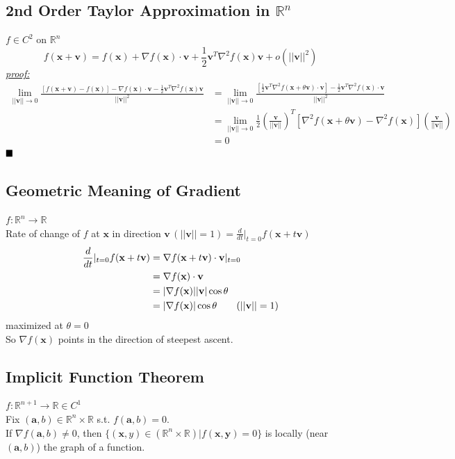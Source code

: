 \documentclass[11pt]{article}
\newcommand{\tb}[1]{\textbf{#1}}
\newcommand{\real}[0]{\mathbb{R}}
\newcommand{\proof}[0]{\textit{\underline{proof:} }}
\newcommand{\vx}[0]{\tb{x}}
\newcommand{\vy}[0]{\tb{y}}
\newcommand{\va}[0]{\tb{a}}
\newcommand{\vv}[0]{\tb{v}}
\newcommand{\qed}[0]{$\hfill\blacksquare$}
\begin{document}
\subsection{2nd Order Taylor Approximation in $\real^n$}
$f \in C^2$ on $\real^n$ \\
$$f(\vx + \vv) = f(\vx) + \nabla f(\vx) \cdot \vv + \frac{1}{2}\vv^T\nabla^2 f(\vx) \vv + o(||\vv||^2)$$
\proof \\
\begin{align*}
	\underset{||\vv|| \rightarrow 0}{\lim} \frac{[f(\vx + \vv) - f(\vx)] - \nabla f(\vx)\cdot \vv - \frac{1}{2} \vv^T \nabla^2 f(\vx)\vv}{||\vv||^2} 
	&= \underset{||\vv|| \rightarrow 0}{\lim} \frac{[\frac{1}{2}\vv^T\nabla^2 f(\vx + \theta \vv) \cdot \vv] - \frac{1}{2}\vv^T\nabla^2 f(\vx) \cdot \vv}{||\vv||^2} \tag{By 2nd MVT}\\
	&=  \underset{||\vv|| \rightarrow 0}{\lim} \frac{1}{2}(\frac{\vv}{||\vv||})^T[\nabla^2 f(\vx + \theta \vv) - \nabla^2 f(\vx)](\frac{\vv}{||\vv||}) \\
	&= 0
\end{align*}
\qed 
\subsection{Geometric Meaning of Gradient}
$f: \real^n \rightarrow \real$\\
Rate of change of $f$ at $\vx$ in direction $\vv \, (||\vv||=1) = \frac{d}{dt}|_{t=0}f(\vx + t\vv)$
\begin{align*}
	\frac{d}{dt}|_{t=0}f(\vx + t\vv) &= \nabla f(\vx + t\vv) \cdot \vv |_{t=0} \\
	&= \nabla f(\vx)\cdot \vv \\
	&= |\nabla f(\vx)| |\vv| \cos \theta\\
	&= |\nabla f(\vx)| \cos \theta \tag{$||\vv||  = 1$}
\end{align*}
maximized at $\theta = 0$ \\
So $\nabla f(\vx)$ points in the direction of steepest ascent.

\subsection{Implicit Function Theorem}
$f: \real^{n+1} \rightarrow \real \in C^1$ \\
Fix $(\va,b) \in \real^n \times \real$ s.t. $f(\va,b) = 0$. \\
If $\nabla f(\va,b) \neq 0$, then $\{(\vx, y) \in (\real^n \times \real) | f(\vx, \vy) = 0\}$ is locally (near $(\va, b)$) the graph of a function.
\end{document}

